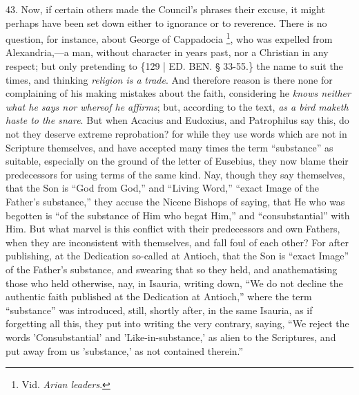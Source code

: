 43. Now, if certain others
made the Council's phrases their excuse, it might perhaps have been
set down either to ignorance or to reverence. There is no question,
for instance, about George of Cappadocia \footnote{Vid. \emph{Arian leaders}.}, who was expelled from Alexandria,—a man, without character
in years past, nor a Christian in any respect; but only pretending to
\{129 | ED.
BEN. § 33-55.\} the name to suit the times, and
thinking \emph{religion is a} \emph{trade}. And therefore reason is
there none for complaining of his making mistakes about the faith,
considering he \emph{knows neither what he says nor whereof he affirms};
but, according to the text, \emph{as a bird maketh haste to the snare}.
But when Acacius and Eudoxius, and Patrophilus say this, do not they
deserve extreme reprobation? for while they use words which are not in
Scripture themselves, and have accepted many times the term ``substance''
as suitable, especially on the ground of the letter of Eusebius, they
now blame their predecessors for using terms of the same kind. Nay,
though they say themselves, that the Son is ``God from God,'' and ``Living
Word,'' ``exact Image of the Father's substance,'' they accuse the Nicene
Bishops of saying, that He who was begotten is ``of the substance of
Him who begat Him,'' and ``consubstantial'' with Him. But what marvel is
this conflict with their predecessors and own Fathers, when they are
inconsistent with themselves, and fall foul of each other? For after
publishing, at the Dedication so-called at Antioch, that the Son is ``exact
Image'' of the Father's substance, and swearing that so they held, and
anathematising those who held otherwise, nay, in Isauria, writing
down, ``We do not decline the authentic faith published at the
Dedication at Antioch,'' where the term ``substance'' was introduced,
still, shortly after, in the same Isauria, as if forgetting all this,
they put into writing the very contrary, saying, ``We reject the words
'Consubstantial' and 'Like-in-substance,' as alien to the Scriptures,
and put away from us 'substance,' as not contained therein.''

